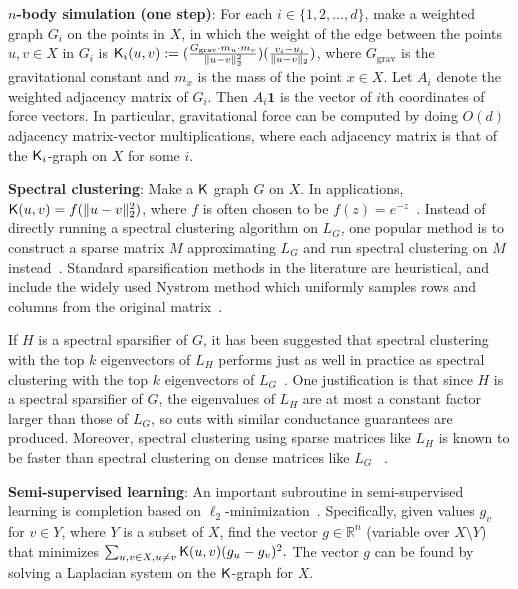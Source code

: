 \vspace{1mm}
\begin{compactenum}
\item \textbf{$n$-body simulation (one step)}: For each $i\in \{1,2,\hdots,d\}$, make a weighted graph $G_i$ on the points in $X$, in which the weight of the edge between the points $u,v\in X$ in $G_i$ is $\mathsf{K}_i(u,v) := (\frac{G_{\text{grav}} \cdot m_u \cdot m_v}{\|u - v\|_2^2})(\frac{v_i - u_i}{\|u - v\|_2})$,  where $G_{\text{grav}}$ is the gravitational constant and $m_x$ is the mass of the point $x\in X$. Let $A_i$ denote the weighted adjacency matrix of $G_i$. Then $A_i\textbf{1}$ is the vector of $i$th coordinates of force vectors. In particular, gravitational force can be computed by doing $O(d)$ adjacency matrix-vector multiplications, where each adjacency matrix is that of the $\mathsf{K}_i$-graph on $X$ for some $i$.

\item \textbf{Spectral clustering}: Make a $\mathsf{K}$ graph $G$ on $X$. In applications, $\mathsf{K}(u,v) = f(\|u-v\|_2^2)$, where $f$ is often chosen to be $f(z) = e^{-z}$~\cite{l07,njw02}. Instead of directly running a spectral clustering algorithm on $L_G$, one popular method is to construct a sparse matrix $M$ approximating $L_G$ and run spectral clustering on $M$ instead~\cite{chl16,csblc11, kmt12}. Standard sparsification methods in the literature are heuristical, and include the widely used Nystrom method which uniformly samples rows and columns from the original matrix~\cite{cjkmm13}. 

If $H$ is a spectral sparsifier of $G$, it has been suggested that spectral clustering with the top $k$ eigenvectors of $L_H$ performs just as well in practice as spectral clustering with the top $k$ eigenvectors of $L_G$~\cite{chl16}. 
One justification is that since $H$ is a spectral sparsifier of $G$, the eigenvalues of $L_H$ are at most a constant factor larger than those of $L_G$, so cuts with similar conductance guarantees are produced. Moreover, spectral clustering using sparse matrices like $L_H$ is known to be faster than spectral clustering on dense matrices like $L_G$ ~\cite{chl16, cjkmm13, kmt12}.

\item \textbf{Semi-supervised learning}: An important subroutine in semi-supervised learning is completion based on $\ell_2$-minimization~\cite{z05, z05survey, lszlh19}. Specifically, given values $g_v$ for $v\in Y$, where $Y$ is a subset of $X$, find the vector $g\in \mathbb{R}^n$ (variable over $X\setminus Y$) that minimizes
$\sum_{u,v\in X,u\ne v} \mathsf{K}(u,v) (g_u - g_v)^2.$
The vector $g$ can be found by solving a Laplacian system on the $\mathsf{K}$-graph for $X$.
\end{compactenum}
\vspace{1mm}

